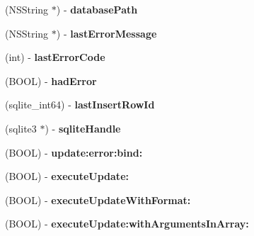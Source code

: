 \begin{DoxyCompactItemize}
\item 
\hypertarget{interface_f_m_database_a3337a9a97a82d9b557dfa9d6086761e6}{
(NSString $\ast$) -\/ {\bfseries databasePath}}
\label{interface_f_m_database_a3337a9a97a82d9b557dfa9d6086761e6}

\item 
\hypertarget{interface_f_m_database_ae6a8a027a922ca609e03800e8843de8e}{
(NSString $\ast$) -\/ {\bfseries lastErrorMessage}}
\label{interface_f_m_database_ae6a8a027a922ca609e03800e8843de8e}

\item 
\hypertarget{interface_f_m_database_afa7c500d40ef6056958c42c65ca8be7a}{
(int) -\/ {\bfseries lastErrorCode}}
\label{interface_f_m_database_afa7c500d40ef6056958c42c65ca8be7a}

\item 
\hypertarget{interface_f_m_database_aeb901b9f50f75b5562211acb2298677e}{
(BOOL) -\/ {\bfseries hadError}}
\label{interface_f_m_database_aeb901b9f50f75b5562211acb2298677e}

\item 
\hypertarget{interface_f_m_database_a5180309bc48a26147c2b3fd0a7d168c7}{
(sqlite\_\-int64) -\/ {\bfseries lastInsertRowId}}
\label{interface_f_m_database_a5180309bc48a26147c2b3fd0a7d168c7}

\item 
\hypertarget{interface_f_m_database_af414914b689624582406a6503b22a2e0}{
(sqlite3 $\ast$) -\/ {\bfseries sqliteHandle}}
\label{interface_f_m_database_af414914b689624582406a6503b22a2e0}

\item 
\hypertarget{interface_f_m_database_ac85f44eef30e6e1d99bebe9151501af2}{
(BOOL) -\/ {\bfseries update:error:bind:}}
\label{interface_f_m_database_ac85f44eef30e6e1d99bebe9151501af2}

\item 
\hypertarget{interface_f_m_database_ab411268a34b954e8d2175e8e1dd759db}{
(BOOL) -\/ {\bfseries executeUpdate:}}
\label{interface_f_m_database_ab411268a34b954e8d2175e8e1dd759db}

\item 
\hypertarget{interface_f_m_database_a2631830a703b7938c1e4067efac9b3a4}{
(BOOL) -\/ {\bfseries executeUpdateWithFormat:}}
\label{interface_f_m_database_a2631830a703b7938c1e4067efac9b3a4}

\item 
\hypertarget{interface_f_m_database_a7cfcf6b83dc81e6f120356096c327b78}{
(BOOL) -\/ {\bfseries executeUpdate:withArgumentsInArray:}}
\label{interface_f_m_database_a7cfcf6b83dc81e6f120356096c327b78}


\end{DoxyCompactItemize}
